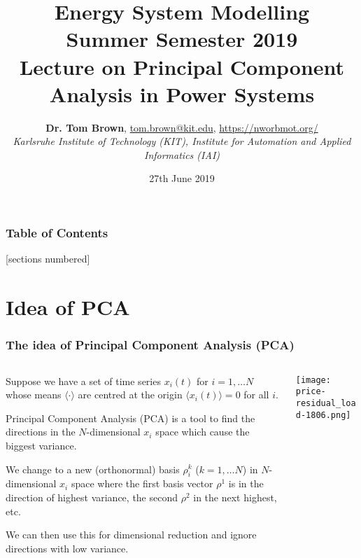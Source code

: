 \documentclass[10pt,aspectratio=169,dvipsnames]{beamer}
\title{Energy System Modelling\\ Summer Semester 2019\\ Lecture on Principal Component Analysis in Power Systems}
\author{
  {\bf Dr. Tom Brown}, \href{mailto:tom.brown@kit.edu}{tom.brown@kit.edu}, \url{https://nworbmot.org/}\\
  \emph{Karlsruhe Institute of Technology (KIT), Institute for Automation and Applied Informatics (IAI)}
}
\date{\vspace{.3cm}27th June 2019}
\begin{document}
\maketitle


\begin{frame}

  \frametitle{Table of Contents}
  [sections numbered]
  \tableofcontents[hideallsubsections]
\end{frame}


\section{Idea of PCA}


\begin{frame}
  \frametitle{The idea of Principal Component Analysis (PCA)}



    \begin{columns}[T]
    \begin{column}{7.5cm}

      Suppose we have a set of time series $x_i(t)$ for $i=1,\dots N$ whose means $\langle \cdot \rangle$ are centred at the origin $\langle x_i(t) \rangle = 0$ for all $i$.

      \vspace{.2cm}

      \alert{Principal Component Analysis (PCA)} is a tool to find the directions in the $N$-dimensional $x_i$ space which cause the biggest variance.

      \vspace{.2cm}

      We change to a new (orthonormal) basis $\rho^k_i$ ($k=1,\dots N$) in $N$-dimensional $x_i$ space where the first basis vector $\rho^1$ is in the direction of highest variance, the second $\rho^2$ in the next highest, etc.

      \vspace{.2cm}

      We can then use this for \alert{dimensional reduction} and ignore directions with low variance.
    \end{column}
    \begin{column}{6.5cm}

        \vspace{.3cm}
        \texttt{[image: price-residual\_load-1806.png]}


    \end{column}
  \end{columns}

\end{frame}
\end{document}
